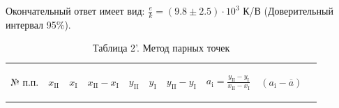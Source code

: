 Окончательный ответ имеет вид: $\frac{e}{k} = (9.8 \pm2.5)\cdot10^3$ К/В (Доверительный интервал 95\%).

\begin{center}
\begin{table}[H]
\centering
\caption*{Таблица 2'. Метод парных точек}
\label{tabl:4}
\begin{tabular}{|c|c|c|c|c|c|c|c|c|c|}
\hline
\begin{minipage}{3mm}
    № п.п. 
\end{minipage}&
\begin{minipage}{5mm}
   \begin{center} $x_{\text{II}}$ \end{center} 
\end{minipage} &
\begin{minipage}{5mm}
   \begin{center} $x_{\text{I}}$ \end{center} 
\end{minipage} &
\begin{minipage}{14mm}
   \begin{center} $x_{\text{II}}-x_{\text{I}}$ \end{center} 
\end{minipage}&
\begin{minipage}{5mm}
   \begin{center} $y_{\text{II}}$ \end{center} 
\end{minipage}&
\begin{minipage}{5mm}
   \begin{center} $y_{\text{I}}$ \end{center} 
\end{minipage}&
\begin{minipage}{14mm}
   \begin{center} $y_{\text{II}}-y_{\text{I}}$ \end{center} 
\end{minipage}&
\begin{minipage}{22mm}
   \begin{center} $a_{\text{i}}=\frac{y_{\text{II}}-y_{\text{I}}}{x_{\text{II}}-x_{\text{I}}}$ \end{center} 
\end{minipage}&
\begin{minipage}{15mm}
     \begin{center} $(a_{\text{i}}-\overline{a})$ \end{center}
\end{minipage}&

\end{tabular}
\end{table}
\end{center}
